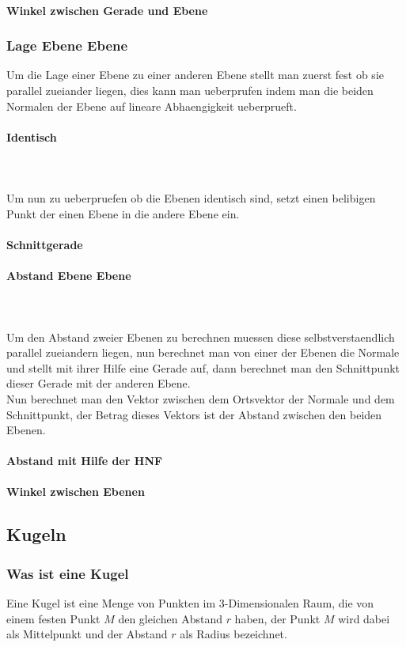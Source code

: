 \documentclass[a4paper]{article} %
\begin{document}
	\paragraph{Winkel zwischen Gerade und Ebene}
	\subsubsection{Lage Ebene Ebene}
	Um die Lage einer Ebene zu einer anderen Ebene stellt man zuerst fest ob sie parallel zueiander liegen, dies kann man ueberprufen indem man die beiden Normalen der Ebene auf lineare Abhaengigkeit ueberprueft.
	\paragraph{Identisch}
		\hspace{0 cm} \\ \noindent \\
	Um nun zu ueberpruefen ob die Ebenen identisch sind, setzt einen belibigen Punkt der einen Ebene in die andere Ebene ein.
	\paragraph{Schnittgerade}
	\paragraph{Abstand Ebene Ebene}
		\hspace{0 cm} \\ \noindent \\
	Um den Abstand zweier Ebenen zu berechnen muessen diese selbstverstaendlich parallel zueiandern liegen, nun berechnet man von einer der Ebenen die Normale und stellt mit ihrer Hilfe eine Gerade auf, dann berechnet man den Schnittpunkt dieser Gerade mit der anderen Ebene.\\
	Nun berechnet man den Vektor zwischen dem Ortsvektor der Normale und dem Schnittpunkt, der Betrag dieses Vektors ist der Abstand zwischen den beiden Ebenen.\\\\
	\textbf{Abstand mit Hilfe der HNF}
	\paragraph{Winkel zwischen Ebenen}
	\subsection{Kugeln}
	\subsubsection{Was ist eine Kugel}
	Eine Kugel ist eine Menge von Punkten im 3-Dimensionalen Raum, die von einem festen Punkt $M$ den gleichen Abstand $r$ haben,
	der Punkt $M$ wird dabei als Mittelpunkt und der Abstand $r$ als Radius bezeichnet.
\end{document}
